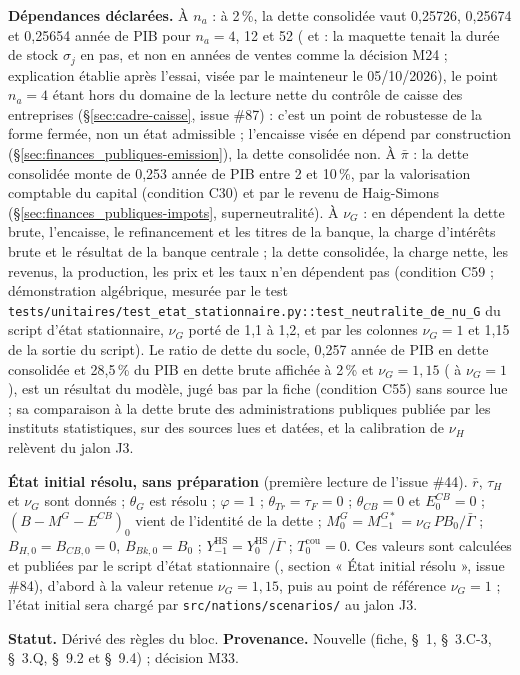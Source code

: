 \documentclass[11pt,a4paper]{article}
\newcommand{\code}[1]{\texttt{\detokenize{#1}}}
\newcommand{\barre}[1]{\leavevmode\sbox{\boitebarre}{#1}\rlap{\rule[0.6ex]{\wd\boitebarre}{0.4pt}}\usebox{\boitebarre}}
\begin{document}
\begin{proposee}
\begin{itemize}
\end{itemize}
\textbf{Dépendances déclarées.} À $n_a$ : à 2\,\%, la dette consolidée vaut 0,25726, 0,25674 et 0,25654 année de PIB pour $n_a = 4$, 12 et 52 (\barre{0,25237} et \barre{0,25844} : la maquette tenait la durée de stock $\sigma_j$ en pas, et non en années de ventes comme la décision M24 ; explication établie après l'essai, visée par le mainteneur le 05/10/2026), le point $n_a = 4$ étant hors du domaine de la lecture nette du contrôle de caisse des entreprises (\S\ref{sec:cadre-caisse}, issue \#87) : c'est un point de robustesse de la forme fermée, non un état admissible ; l'encaisse visée en dépend par construction (\S\ref{sec:finances_publiques-emission}), la dette consolidée non. À $\bar\pi$ : la dette consolidée monte de 0,253 année de PIB entre 2 et 10\,\%, par la valorisation comptable du capital (condition C30) et par le revenu de Haig-Simons (\S\ref{sec:finances_publiques-impots}, superneutralité). À $\nu_G$ : en dépendent la dette brute, l'encaisse, le refinancement et les titres de la banque, la charge d'intérêts brute et le résultat de la banque centrale ; la dette consolidée, la charge nette, les revenus, la production, les prix et les taux n'en dépendent pas (condition C59 ; démonstration algébrique, mesurée par le test \nolinkurl{tests/unitaires/test_etat_stationnaire.py::test_neutralite_de_nu_G} du script d'état stationnaire, $\nu_G$ porté de 1,1 à 1,2, et par les colonnes $\nu_G = 1$ et 1,15 de la sortie du script). Le ratio de dette du socle, 0,257 année de PIB en dette consolidée et 28,5\,\% du PIB en dette brute affichée à 2\,\% et $\nu_G = 1{,}15$ (\barre{28,2\,\%} à $\nu_G = 1$), est un résultat du modèle, jugé bas par la fiche (condition C55) sans source lue ; sa comparaison à la dette brute des administrations publiques publiée par les instituts statistiques, sur des sources lues et datées, et la calibration de $\nu_H$ relèvent du jalon J3.

\textbf{État initial résolu, sans préparation} (première lecture de l'issue \#44). $\bar r$, $\tau_H$ et $\nu_G$ sont donnés ; $\theta_G$ est résolu ; $\varphi = 1$ ; $\theta_{\mathit{Tr}} = \tau_F = 0$ ; $\theta_{\mathit{CB}} = 0$ et $E^{\mathit{CB}}_0 = 0$ ; $(B - M^G - E^{\mathit{CB}})_0$ vient de l'identité de la dette ; $M^G_0 = M^{G*}_{-1} = \nu_G\,\mathit{PB}_0/\bar\Gamma$ ; $B_{H,0} = B_{\mathit{CB},0} = 0$, $B_{\mathit{Bk},0} = B_0$ ; $Y^{\mathrm{HS}}_{-1} = Y^{\mathrm{HS}}_0/\bar\Gamma$ ; $T^{\mathrm{cou}}_0 = 0$. Ces valeurs sont calculées et publiées par le script d'état stationnaire (\code{outils/etat_stationnaire.py}, section « État initial résolu », issue \#84), d'abord à la valeur retenue $\nu_G = 1{,}15$, puis au point de référence $\nu_G = 1$ ; l'état initial sera chargé par \nolinkurl{src/nations/scenarios/} au jalon J3.

\textbf{Statut.} Dérivé des règles du bloc. \textbf{Provenance.} Nouvelle (fiche, \S~1, \S~3.C-3, \S~3.Q, \S~9.2 et \S~9.4) ; décision M33.
\end{proposee}
\end{document}
